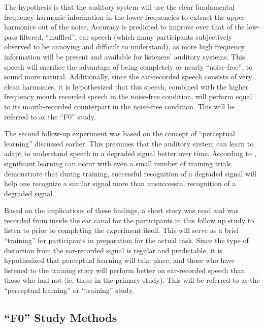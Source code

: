 \documentclass[dissertation,copyright]{uathesis}
\begin{document}
The hypothesis is that the auditory system will use the clear fundamental frequency harmonic information in the lower frequencies to extract the upper harmonics out of the noise.  Accuracy is predicted to improve over that of the low-pass filtered, ``muffled'', ear speech (which many participants subjectively observed to be annoying and difficult to understand), as more high frequency information will be present and available for listeners' auditory systems.  This speech will sacrifice the advantage of being completely or nearly ``noise-free'', to sound more natural.  Additionally, since the ear-recorded speech consists of very clean harmonics, it is hypothesized that this speech, combined with the higher frequency mouth recorded speech in the noise-free condition, will perform equal to its mouth-recorded counterpart in the noise-free condition. This will be referred to as the ``F0'' study.

The second follow-up experiment was based on the concept of ``perceptual learning'' discussed earlier.  This presumes that the auditory system can learn to adapt to understand speech in a degraded signal better over time.  According to \cite{mattys:12}, significant learning can occur with even a small number of training trials.  \cite{davis:05} demonstrate that during training, successful recognition of a degraded signal will help one recognize a similar signal more than unsuccessful recognition of a degraded signal.  

Based on the implications of these findings, a short story was read and was recorded from inside the ear canal for the participants in this follow up study to listen to prior to completing the experiment itself.  This will serve as a brief ``training'' for participants in preparation for the actual task. Since the type of distortion from the ear-recorded signal is regular and predictable, it is hypothesized that perceptual learning will take place, and those who have listened to the training story will perform better on ear-recorded speech than those who had not (ie. those in the primary study). This will be referred to as the ``perceptual learning'' or ``training'' study.


\subsection{``F0'' Study Methods}
\label{F0-methods}
\end{document}
